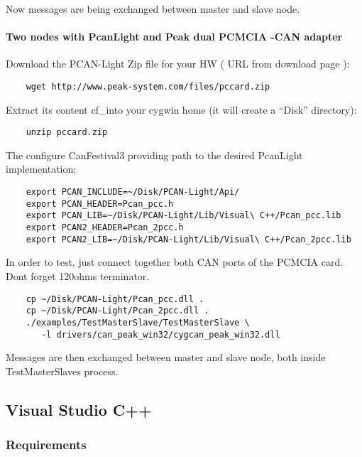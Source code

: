 \documentclass[12pt,english,a4paper]{book}
\begin{document}
Now messages are being exchanged between master and slave node.

\paragraph{Two nodes with PcanLight and Peak dual PCMCIA -CAN adapter}

Download the PCAN-Light Zip file for your HW ( URL from download
page ):


\begin{verbatim}
	wget http://www.peak-system.com/files/pccard.zip
\end{verbatim}


Extract its content cf_into your cygwin home (it will create a {}``Disk''
directory):


\begin{verbatim}
	unzip pccard.zip
\end{verbatim}


The configure CanFestival3 providing path to the desired PcanLight
implementation:


\begin{verbatim}
	export PCAN_INCLUDE=~/Disk/PCAN-Light/Api/
	export PCAN_HEADER=Pcan_pcc.h
	export PCAN_LIB=~/Disk/PCAN-Light/Lib/Visual\ C++/Pcan_pcc.lib
	export PCAN2_HEADER=Pcan_2pcc.h
	export PCAN2_LIB=~/Disk/PCAN-Light/Lib/Visual\ C++/Pcan_2pcc.lib
\end{verbatim}


In order to test, just connect together both CAN ports of the PCMCIA
card. Don{\textquotesingle}t forget 120ohms terminator.


\begin{verbatim}
	cp ~/Disk/PCAN-Light/Pcan_pcc.dll .
	cp ~/Disk/PCAN-Light/Pcan_2pcc.dll .
	./examples/TestMasterSlave/TestMasterSlave \
	   -l drivers/can_peak_win32/cygcan_peak_win32.dll
\end{verbatim}


Messages are then exchanged between master and slave node, both inside
TestMasterSlave{\textquotesingle}s process.

\subsection{Visual Studio C++}

\subsubsection{Requirements}
\end{document}

